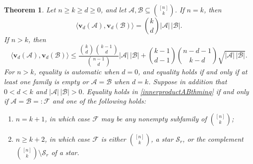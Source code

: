 \documentclass[10pt,a4paper]{amsart}
\numberwithin{equation}{section}
\newtheorem{theorem}{Theorem}[section]
\begin{document}
\begin{theorem}\label{innerproductABthm}
Let $n\geq k\geq d\geq0$, and let
$\mathcal{A},\mathcal{B}\subseteq\binom{[n]}{k}$.
If $n=k$, then
\begin{equation}\label{eq:innerproduct-n-equals-k}
\big\langle\mathbf{v}_d(\mathcal{A}),
\mathbf{v}_d(\mathcal{B})\big\rangle
=\binom kd|\mathcal{A}|\,|\mathcal{B}|.
\end{equation}
If $n>k$, then
\begin{equation}\label{innerproductABthminq}
\big\langle\mathbf{v}_d(\mathcal{A}),
\mathbf{v}_d(\mathcal{B})\big\rangle
\leq
\frac{\binom{k}{d}\binom{k-1}{d}}{\binom{n-1}{d}}
|\mathcal{A}|\,|\mathcal{B}| +\binom{k-1}{d-1}\binom{n-d-1}{k-d}
\sqrt{|\mathcal{A}|\,|\mathcal{B}|}.
\end{equation}
For $n>k$, equality is automatic when $d=0$,
and equality
holds if and only if at least one family is empty or
$\mathcal{A}=\mathcal{B}$ when $d=k$.
Suppose in addition that $0<d<k$ and
$|\mathcal{A}|\,|\mathcal{B}|>0$.
Equality holds in
\eqref{innerproductABthminq} if and only if
$\mathcal{A}=\mathcal{B}=:\mathcal{F}$ and one of the following holds:
\begin{enumerate}[label={\rm (\roman*)}]
\item $n=k+1$, in which case $\mathcal{F}$ may be any nonempty
subfamily of $\binom{[n]}{k}$;
\item $n\geq k+2$, in which case $\mathcal{F}$ is either
$\binom{[n]}{k}$, a star $\mathcal{S}_r$, or the complement
$\binom{[n]}{k}\setminus\mathcal{S}_r$ of a star.
\end{enumerate}
\end{theorem}
\end{document}
